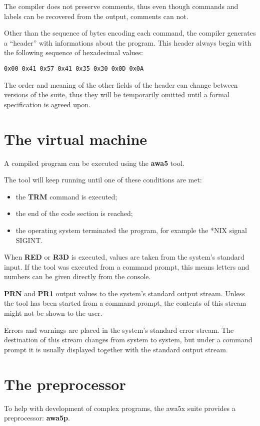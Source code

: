 \documentclass[11pt,a4paper,draft]{book}
\begin{document}
The compiler does not preserve comments, thus even though commands and
labels can be recovered from the output, comments can not.

Other than the sequence of bytes encoding each command, the compiler
generates a \enquote{header} with informations about the program. This
header always begin with the following sequence of hexadecimal values:
\begin{verbatim}
0x00 0x41 0x57 0x41 0x35 0x30 0x0D 0x0A
\end{verbatim}

The order and meaning of the other fields of the header can change
between versions of the suite, thus they will be temporarily omitted
until a formal specification is agreed upon.

\section{The virtual machine}
A compiled program can be executed using the \textbf{awa5} tool.

The tool will keep running until one of these conditions are met:
\begin{itemize}
\item the \textbf{TRM} command is executed;
\item the end of the code section is reached;
\item the operating system terminated the program, for example the
  *NIX signal SIGINT.
\end{itemize}

When \textbf{RED} or \textbf{R3D} is executed, values are taken from
the system's standard input. If the tool was executed from a command
prompt, this means letters and numbers can be given directly from the
console.

\textbf{PRN} and \textbf{PR1} output values to the system's standard
output stream. Unless the tool has been started from a command prompt,
the contents of this stream might not be shown to the user.

Errors and warnings are placed in the system's standard error
stream. The destination of this stream changes from system to system,
but under a command prompt it is usually displayed together with the
standard output stream.

\section{The preprocessor}
To help with development of complex programs, the awa5x suite provides
a preprocessor: \textbf{awa5p}.
\end{document}
